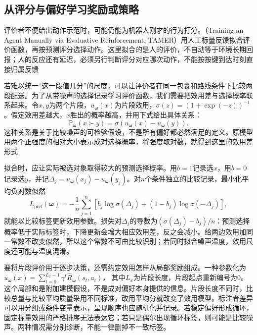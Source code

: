 \subsection{从评分与偏好学习奖励或策略}
\label{sec:rl-reward-preference}

评价者不便给出动作示范时，可能仍能为机器人刚才的行为打分。（Training an Agent Manually via Evaluative Reinforcement, TAMER）用人工标量反馈拟合评价函数，再按预测评分选择动作。这里拟合的是人的评价，不自动等于环境长期回报；人的反应还有延迟，必须另行判断评分对应哪次动作，不能按按键到达时刻直接归属反馈

若难以统一“这一段值几分”的尺度，可以让评价者在同一包裹和路线条件下比较两段配送。为了从带噪声的选择记录学习评价函数，我们需要把效用差与选择概率联系起来。令$x,y$为两个片段，$u_{\bm{\omega}}(x)$为片段效用，$\sigma(z)=(1+\exp(-z))^{-1}$。假定效用差越大，$x$胜出的概率越高，并用下式给出具体关系：
\begin{equation}
  \mathbb P_{\bm{\omega}}(x\succ y)
    =\sigma\!\left(u_{\bm{\omega}}(x)-u_{\bm{\omega}}(y)\right).
  \label{eq:rl-reward-bt}
\end{equation}
这种关系是关于比较噪声的可检验假设，不是所有偏好都必然满足的定义。原模型用两个正强度的相对大小表示成对选择概率，将强度取对数，就得到这里的效用差形式

拟合时，应让实际被选对象取得较大的预测选择概率。用$b=1$记录选$x$，用$b=0$记录选$y$，并记$\Delta_j=u_{\bm{\omega}}(x_j)-u_{\bm{\omega}}(y_j)$。对$n$个条件独立的比较记录，最小化平均负对数似然
\begin{equation}
  L_{\mathrm{pref}}(\bm{\omega})
  =-\frac1n\sum_{j=1}^n
    \left[b_j\log\sigma(\Delta_j)
      +(1-b_j)\log\sigma(-\Delta_j)\right],
  \label{eq:rl-reward-bt-loss}
\end{equation}
就能以比较标签更新效用参数。损失对$\Delta_j$的导数为$(\sigma(\Delta_j)-b_j)/n$：预测选择概率低于实际标签时，下降更新会增大相应效用差，反之会减小。给两边效用加同一常数不改变似然，所以这个常数不可由比较识别；若同时拟合噪声温度，效用尺度还可能与温度混淆。

要将片段评价用于逐步决策，还需约定效用怎样从局部奖励组成。一种参数化为
$u_{\bm{\omega}}(x)=\sum_{t=0}^{L_x-1}\gamma^t
\widehat R_{\bm{\omega}}(s_t,a_t)$，
其中$L_x$为片段长度，片段起点重新编号为0。这个局部和是附加建模假设，不是成对偏好本身提供的信息。片段长度不同时，比较总量与比较平均质量采用不同标准，改用平均分就改变了效用模型。标注者差异可以用分组或条件变量表示，呈现顺序也应随机化并记录。若稳定偏好形成循环，固定标量效用的严格排序无法表达它；若只是偶尔出现循环标签，则可能是比较噪声。两种情况需分别诊断，不能一律删掉不一致标签。

